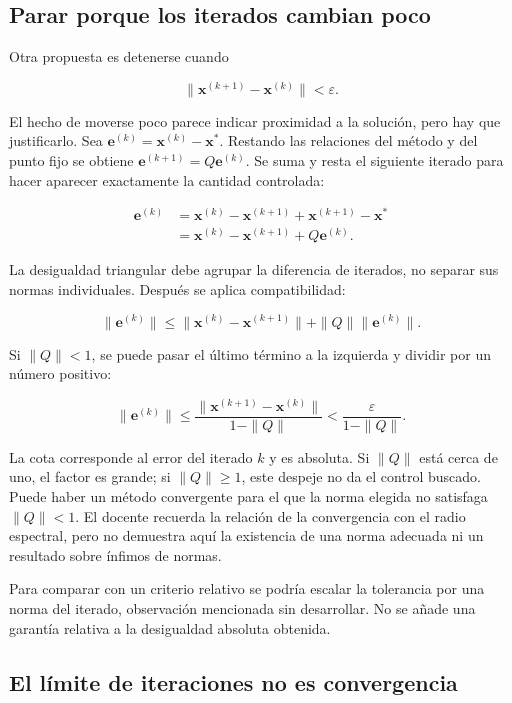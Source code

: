 \documentclass[12pt,a4paper]{article}
\begin{document}
\subsection{Parar porque los iterados cambian poco}

Otra propuesta es detenerse cuando

\[
\|\mathbf x^{(k+1)}-\mathbf x^{(k)}\|<\varepsilon.
\]

El hecho de moverse poco parece indicar proximidad a la solución, pero hay que justificarlo. Sea $\mathbf e^{(k)}=\mathbf x^{(k)}-\mathbf x^*$. Restando las relaciones del método y del punto fijo se obtiene $\mathbf e^{(k+1)}=Q\mathbf e^{(k)}$. Se suma y resta el siguiente iterado para hacer aparecer exactamente la cantidad controlada:

\[
\begin{aligned}
\mathbf e^{(k)}
&=\mathbf x^{(k)}-\mathbf x^{(k+1)}
  +\mathbf x^{(k+1)}-\mathbf x^*\\
&=\mathbf x^{(k)}-\mathbf x^{(k+1)}+Q\mathbf e^{(k)}.
\end{aligned}
\]

La desigualdad triangular debe agrupar la diferencia de iterados, no separar sus normas individuales. Después se aplica compatibilidad:

\[
\|\mathbf e^{(k)}\|
\le\|\mathbf x^{(k)}-\mathbf x^{(k+1)}\|
+\|Q\|\|\mathbf e^{(k)}\|.
\]

Si $\|Q\|<1$, se puede pasar el último término a la izquierda y dividir por un número positivo:

\[
\boxed{\|\mathbf e^{(k)}\|
\le\frac{\|\mathbf x^{(k+1)}-\mathbf x^{(k)}\|}{1-\|Q\|}
<\frac{\varepsilon}{1-\|Q\|}}.
\]

La cota corresponde al error del iterado $k$ y es absoluta. Si $\|Q\|$ está cerca de uno, el factor es grande; si $\|Q\|\ge1$, este despeje no da el control buscado. Puede haber un método convergente para el que la norma elegida no satisfaga $\|Q\|<1$. El docente recuerda la relación de la convergencia con el radio espectral, pero no demuestra aquí la existencia de una norma adecuada ni un resultado sobre ínfimos de normas.

Para comparar con un criterio relativo se podría escalar la tolerancia por una norma del iterado, observación mencionada sin desarrollar. No se añade una garantía relativa a la desigualdad absoluta obtenida.

\subsection{El límite de iteraciones no es convergencia}
\end{document}

